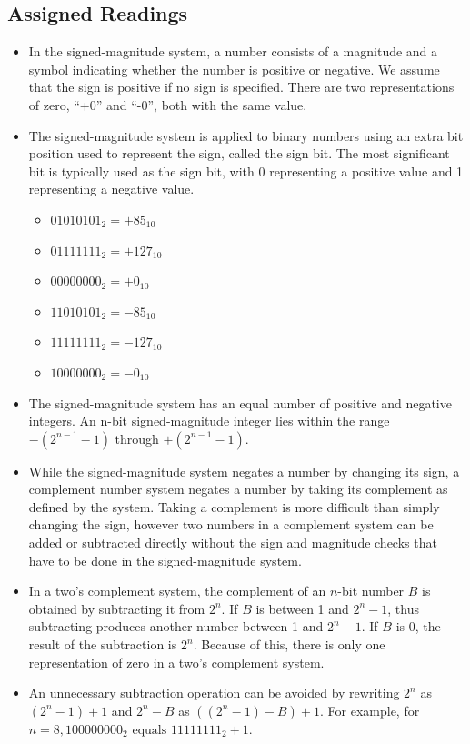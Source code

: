 \documentclass[10pt,a4paper]{article}
\begin{document}
\subsection{Assigned Readings}
\begin{itemize}
\item In the signed-magnitude system, a number consists of a magnitude and a symbol indicating whether the number is positive or negative. We assume that the sign is positive if no sign is specified. There are two representations of zero, ``+0'' and ``-0'', both with the same value.
\item The signed-magnitude system is applied to binary numbers using an extra bit position used to represent the sign, called the sign bit. The most significant bit is typically used as the sign bit, with 0 representing a positive value and 1 representing a negative value.
\begin{itemize}
\item $01010101_2=+85_{10}$
\item $01111111_2=+127_{10}$
\item $00000000_2=+0_{10}$
\item $11010101_2=-85_{10}$
\item $11111111_2=-127_{10}$
\item $10000000_2=-0_{10}$
\end{itemize}
\item The signed-magnitude system has an equal number of positive and negative integers. An n-bit signed-magnitude integer lies within the range $-(2^{n-1}-1)$ through $+(2^{n-1}-1)$.
\item While the signed-magnitude system negates a number by changing its sign, a complement number system negates a number by taking its complement as defined by the system. Taking a complement is more difficult than simply changing the sign, however two numbers in a complement system can be added or subtracted directly without the sign and magnitude checks that have to be done in the signed-magnitude system.
\item In a two's complement system, the complement of an $n$-bit number $B$ is obtained by subtracting it from $2^n$. If $B$ is between 1 and $2^n-1$, thus subtracting produces another number between 1 and $2^n-1$. If $B$ is 0, the result of the subtraction is $2^n$. Because of this, there is only one representation of zero in a two's complement system. 
\item An unnecessary subtraction operation can be avoided by rewriting $2^n$ as $(2^n-1)+1$ and $2^n-B$ as $((2^n-1)-B)+1$. For example, for $n=8, 100000000_2\text{ equals }11111111_2+1$. 

\end{itemize}
\end{document}
